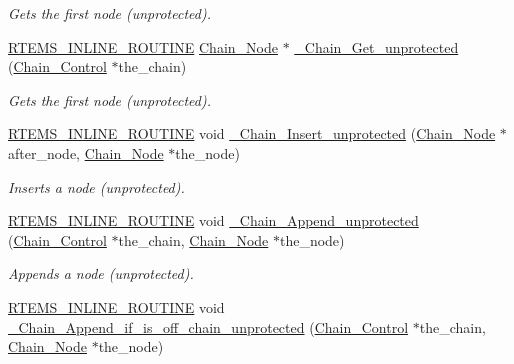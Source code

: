 \begin{DoxyCompactItemize}
\begin{DoxyCompactList}\small\item\em Gets the first node (unprotected). \end{DoxyCompactList}\item 
\mbox{\hyperlink{group__RTEMSScoreBaseDefs_gac216239df231d5dbd15e3520b0b9313f}{R\+T\+E\+M\+S\+\_\+\+I\+N\+L\+I\+N\+E\+\_\+\+R\+O\+U\+T\+I\+NE}} \mbox{\hyperlink{group__RTEMSScoreChain_ga0dd4bfcca1ac7f90de2842e447846d3d}{Chain\+\_\+\+Node}} $\ast$ \mbox{\hyperlink{group__RTEMSScoreChain_gac5bb79fd8e5b468790918a8e674a5d36}{\+\_\+\+Chain\+\_\+\+Get\+\_\+unprotected}} (\mbox{\hyperlink{unionChain__Control}{Chain\+\_\+\+Control}} $\ast$the\+\_\+chain)
\begin{DoxyCompactList}\small\item\em Gets the first node (unprotected). \end{DoxyCompactList}\item 
\mbox{\hyperlink{group__RTEMSScoreBaseDefs_gac216239df231d5dbd15e3520b0b9313f}{R\+T\+E\+M\+S\+\_\+\+I\+N\+L\+I\+N\+E\+\_\+\+R\+O\+U\+T\+I\+NE}} void \mbox{\hyperlink{group__RTEMSScoreChain_ga0ac64438b8eb6f4dfd182bc3885cea42}{\+\_\+\+Chain\+\_\+\+Insert\+\_\+unprotected}} (\mbox{\hyperlink{group__RTEMSScoreChain_ga0dd4bfcca1ac7f90de2842e447846d3d}{Chain\+\_\+\+Node}} $\ast$after\+\_\+node, \mbox{\hyperlink{group__RTEMSScoreChain_ga0dd4bfcca1ac7f90de2842e447846d3d}{Chain\+\_\+\+Node}} $\ast$the\+\_\+node)
\begin{DoxyCompactList}\small\item\em Inserts a node (unprotected). \end{DoxyCompactList}\item 
\mbox{\hyperlink{group__RTEMSScoreBaseDefs_gac216239df231d5dbd15e3520b0b9313f}{R\+T\+E\+M\+S\+\_\+\+I\+N\+L\+I\+N\+E\+\_\+\+R\+O\+U\+T\+I\+NE}} void \mbox{\hyperlink{group__RTEMSScoreChain_gaa7011c6fe160c457a0d100e41ec3fffe}{\+\_\+\+Chain\+\_\+\+Append\+\_\+unprotected}} (\mbox{\hyperlink{unionChain__Control}{Chain\+\_\+\+Control}} $\ast$the\+\_\+chain, \mbox{\hyperlink{group__RTEMSScoreChain_ga0dd4bfcca1ac7f90de2842e447846d3d}{Chain\+\_\+\+Node}} $\ast$the\+\_\+node)
\begin{DoxyCompactList}\small\item\em Appends a node (unprotected). \end{DoxyCompactList}\item 
\mbox{\hyperlink{group__RTEMSScoreBaseDefs_gac216239df231d5dbd15e3520b0b9313f}{R\+T\+E\+M\+S\+\_\+\+I\+N\+L\+I\+N\+E\+\_\+\+R\+O\+U\+T\+I\+NE}} void \mbox{\hyperlink{group__RTEMSScoreChain_ga43e0c764eb41b45042846bb8b1ffbdc4}{\+\_\+\+Chain\+\_\+\+Append\+\_\+if\+\_\+is\+\_\+off\+\_\+chain\+\_\+unprotected}} (\mbox{\hyperlink{unionChain__Control}{Chain\+\_\+\+Control}} $\ast$the\+\_\+chain, \mbox{\hyperlink{group__RTEMSScoreChain_ga0dd4bfcca1ac7f90de2842e447846d3d}{Chain\+\_\+\+Node}} $\ast$the\+\_\+node)

\end{DoxyCompactItemize}

